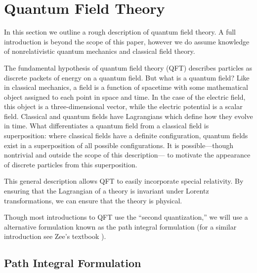 \documentclass[12pt]{report}
\begin{document}
\section{Quantum Field Theory}


In this section we outline a rough description of quantum field theory. A full introduction is beyond the scope of this paper, however we do assume knowledge of nonrelativistic quantum mechanics and classical field theory.

The fundamental hypothesis of quantum field theory (QFT) describes particles as discrete packets of energy on a quantum field. But what is a quantum field? Like in classical mechanics, a field is a function of spacetime with some mathematical object assigned to each point in space and time. In the case of the electric field, this object is a three-dimensional vector, while the electric potential is a scalar field. Classical and quantum fields have Lagrangians which define how they evolve in time. What differentiates a quantum field from a classical field is superposition: where classical fields have a definite configuration, quantum fields exist in a superposition of all possible configurations. It is possible---though nontrivial and outside the scope of this description--- to motivate the appearance of discrete particles from this superposition.

This general description allows QFT to easily incorporate special relativity. By ensuring that the Lagrangian of a theory is invariant under Lorentz transformations, we can ensure that the theory is physical. %

Though most introductions to QFT use the ``second quantization,'' we will use a alternative formulation known as the path integral formulation (for a similar introduction see Zee's textbook \cite{zee2010}).
 
\subsection{Path Integral Formulation}
\end{document}
